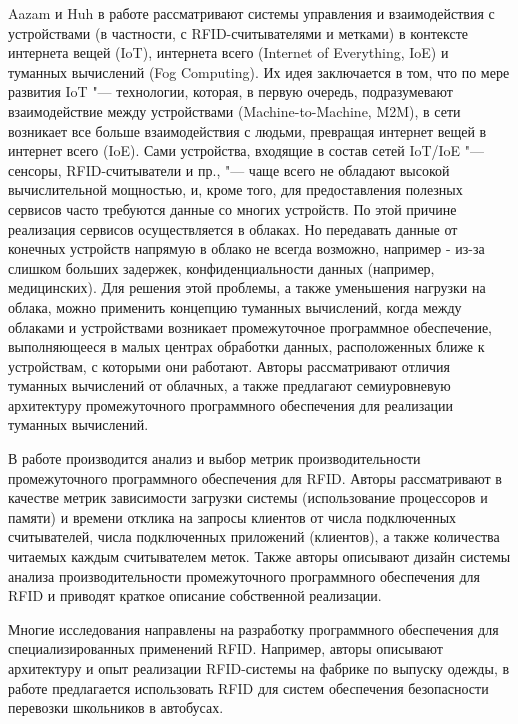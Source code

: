 Aazam и Huh в работе \cite{Aazam2016} рассматривают системы управления и взаимодействия с устройствами (в частности, с RFID-считывателями и метками) в контексте интернета вещей (IoT), интернета всего (Internet of Everything, IoE) и туманных вычислений (Fog Computing). Их идея заключается в том, что по мере развития IoT "--- технологии, которая, в первую очередь, подразумевают взаимодействие между устройствами (Machine-to-Machine, M2M), в сети возникает все больше взаимодействия с людьми, превращая интернет вещей в интернет всего (IoE). Сами устройства, входящие в состав сетей IoT/IoE "--- сенсоры, RFID-считыватели и пр., "--- чаще всего не обладают высокой вычислительной мощностью, и, кроме того, для предоставления полезных сервисов часто требуются данные со многих устройств. По этой причине реализация сервисов осуществляется в облаках. Но передавать данные от конечных устройств напрямую в облако не всегда возможно, например - из-за слишком больших задержек, конфиденциальности данных (например, медицинских). Для решения этой проблемы, а также уменьшения нагрузки на облака, можно применить концепцию туманных вычислений, когда между облаками и устройствами возникает промежуточное программное обеспечение, выполняющееся в малых центрах обработки данных, расположенных ближе к устройствам, с которыми они работают. Авторы рассматривают отличия туманных вычислений от облачных, а также предлагают семиуровневую архитектуру промежуточного программного обеспечения для реализации туманных вычислений.

В работе \cite{JongyoungLee2006} производится анализ и выбор метрик производительности промежуточного программного обеспечения для RFID. Авторы рассматривают в качестве метрик зависимости загрузки системы (использование процессоров и памяти) и времени отклика на запросы клиентов от числа подключенных считывателей, числа подключенных приложений (клиентов), а также количества читаемых каждым считывателем меток. Также авторы описывают дизайн системы анализа производительности промежуточного программного обеспечения для RFID и приводят краткое описание собственной реализации.

Многие исследования направлены на разработку программного обеспечения для специализированных применений RFID. Например, авторы \cite{Li2010} описывают архитектуру и опыт реализации RFID-системы на фабрике по выпуску одежды, в работе \cite{Shah2016} предлагается использовать RFID для систем обеспечения безопасности перевозки школьников в автобусах.

